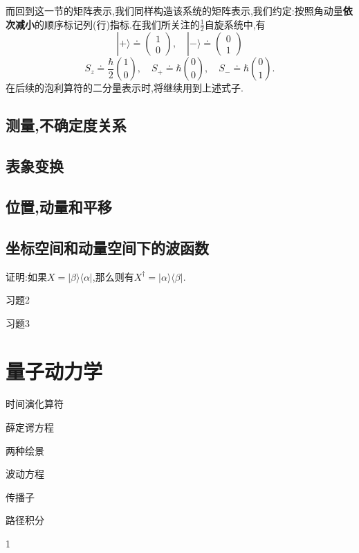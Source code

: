 \documentclass[lang=cn,newtx,10pt,scheme=chinese,thmcnt=section]{elegantbook}
\begin{document}
而回到这一节的矩阵表示,我们同样构造该系统的矩阵表示,我们约定:按照角动量\textbf{依次减小}的顺序标记列(行)指标.在我们所关注的$\frac12$自旋系统中,有
\begin{equation}
	|+\rangle\doteq\begin{pmatrix}1\\0\end{pmatrix},\quad|-\rangle\doteq\begin{pmatrix}0\\1\end{pmatrix}
\end{equation}
\begin{equation}
	S_z\doteq\frac{\hbar}{2}\binom{1}{0},\quad S_+\doteq\hbar\binom{0}{0},\quad S_-\doteq\hbar\binom{0}{1}.
\end{equation}
在后续的泡利算符的二分量表示时,将继续用到上述式子.
\section{测量,不确定度关系}
\section{表象变换}
\section{位置,动量和平移}
\section{坐标空间和动量空间下的波函数}
\begin{problemset}
	\item 证明:如果$X=|\beta\rangle\langle\alpha|$,那么则有$X^\dagger=|\alpha\rangle\langle\beta|$.
	\item 习题2
	\item 习题3
\end{problemset}
\chapter{量子动力学}
\begin{introduction}
	\item 时间演化算符
	\item 薛定谔方程
	\item 两种绘景
	\item 波动方程
	\item 传播子
	\item 路径积分
\end{introduction}
1
\end{document}
